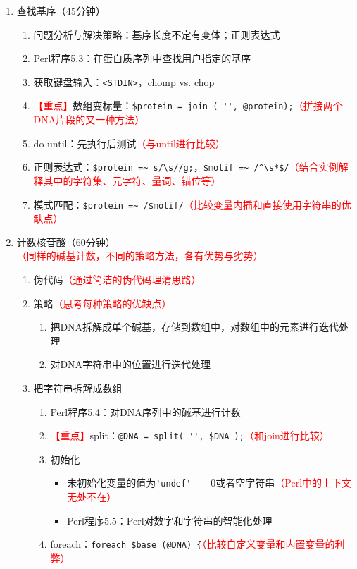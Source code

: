 \documentclass{TIJMUjiaoanLL}
\begin{document}
\begin{enumerate}
  \item 查找基序（45分钟）
    \begin{enumerate}
      \item 问题分析与解决策略：基序长度不定有变体；正则表达式
      \item Perl程序5.3：在蛋白质序列中查找用户指定的基序
      \item 获取键盘输入：\verb|<STDIN>|，chomp vs. chop
      \item \textcolor{red}{【重点】}数组变标量：\verb|$protein = join ( '', @protein);|\textcolor{red}{（拼接两个DNA片段的又一种方法）}
      \item do-until：先执行后测试\textcolor{red}{（与until进行比较）}
      \item 正则表达式：\verb|$protein =~ s/\s//g;|，\verb|$motif =~ /^\s*$/|\textcolor{red}{（结合实例解释其中的字符集、元字符、量词、锚位等）}
      \item 模式匹配：\verb|$protein =~ /$motif/|\textcolor{red}{（比较变量内插和直接使用字符串的优缺点）}
    \end{enumerate}
  \item 计数核苷酸（60分钟）\textcolor{red}{（同样的碱基计数，不同的策略方法，各有优势与劣势）}
    \begin{enumerate}
      \item 伪代码\textcolor{red}{（通过简洁的伪代码理清思路）}
      \item 策略\textcolor{red}{（思考每种策略的优缺点）}
	\begin{enumerate}
	  \item 把DNA拆解成单个碱基，存储到数组中，对数组中的元素进行迭代处理
	  \item 对DNA字符串中的位置进行迭代处理
	\end{enumerate}
      \item 把字符串拆解成数组
	\begin{enumerate}
	  \item Perl程序5.4：对DNA序列中的碱基进行计数
	  \item \textcolor{red}{【重点】}split：\verb|@DNA = split( '', $DNA );|\textcolor{red}{（和join进行比较）}
	  \item 初始化
	    \begin{itemize}
	      \item 未初始化变量的值为\verb|'undef'|——0或者空字符串\textcolor{red}{（Perl中的上下文无处不在）}
	      \item Perl程序5.5：Perl对数字和字符串的智能化处理
	    \end{itemize}
	  \item foreach：\verb|foreach $base (@DNA) {|\textcolor{red}{（比较自定义变量和内置变量的利弊）}

\end{enumerate}
\end{enumerate}
\end{enumerate}
\end{document}
